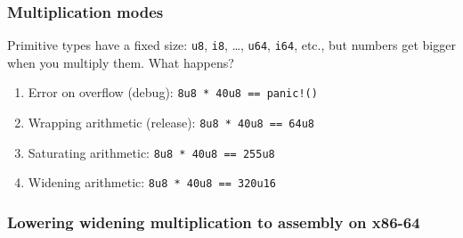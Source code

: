 \documentclass[xetex,aspectratio=169]{beamer}
\begin{document}
  \begin{frame}
    \frametitle{Multiplication modes}
    Primitive types have a fixed size: \texttt{u8}, \texttt{i8}, \ldots, \texttt{u64}, \texttt{i64}, etc., but numbers get bigger when you multiply them.  What happens?
    
    \pause
    \begin{enumerate}
    \item<3-> Error on overflow (\alert{debug}): \texttt{8u8 * 40u8 == panic!()}
    \item<4-> Wrapping arithmetic (\alert{release}): \texttt{8u8 * 40u8 == 64u8}
    \item<5-> Saturating arithmetic: \texttt{8u8 * 40u8 == 255u8}
    \item<6-> Widening arithmetic: \texttt{8u8 * 40u8 == 320u16}
    \end{enumerate}
    
   
  \end{frame}
  
  {
    \begin{frame}[plain]
      \frametitle{Lowering widening multiplication to assembly on x86-64}
    \end{frame}
  }
  
\end{document}
